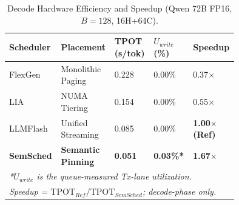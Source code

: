 \documentclass[10pt,conference,letterpaper]{IEEEtran}
\newcommand{\todo}[1]{\textcolor{red}{\textbf{[TODO: #1]}}}
\begin{document}
\begin{table}[t]
  \setlength{\abovecaptionskip}{0.1cm}
  \setlength{\belowcaptionskip}{-0.1cm}
\scriptsize
\centering
\caption{Decode Hardware Efficiency and Speedup (Qwen 72B FP16, $B{=}128$, 16H+64C).}
\label{tab:hardware_efficiency}
\begin{tabular}{@{}p{0.15\linewidth}p{0.15\linewidth}p{0.15\linewidth}p{0.15\linewidth}p{0.15\linewidth}@{}}
\toprule
\textbf{Scheduler} & \textbf{Placement} & \textbf{TPOT (s/tok)} & \textbf{$U_{write}$ (\%)} & \textbf{Speedup} \\
\midrule
FlexGen    & Monolithic Paging & 0.228 & 0.00\% & 0.37$\times$ \\
LIA        & NUMA Tiering      & 0.154 & 0.00\% & 0.55$\times$ \\
LLMFlash   & Unified Streaming & 0.085 & 0.00\% & \textbf{1.00$\times$ (Ref)} \\
\textbf{SemSched} & \textbf{Semantic Pinning} & \textbf{0.051} & \textbf{0.03\%*} & \textbf{1.67$\times$} \\
\bottomrule
 \multicolumn{5}{l}{\scriptsize \textit{*$U_{write}$ is the queue-measured Tx-lane utilization.}} \\
\multicolumn{5}{l}{\scriptsize \textit{Speedup = $\text{TPOT}_{Ref} / \text{TPOT}_{SemSched}$; decode-phase only.}}
\end{tabular}
\vspace{-12pt}
\end{table}

\begin{table}[t]
\scriptsize
\centering
\setlength{\tabcolsep}{3pt}
\caption{Per-mechanism ablation on Qwen 72B ($B{=}128$, prefill=512, decode=16). \todo{re-run}}
\label{tab:ablation}
\vspace{2mm}
\end{table}
\end{document}
